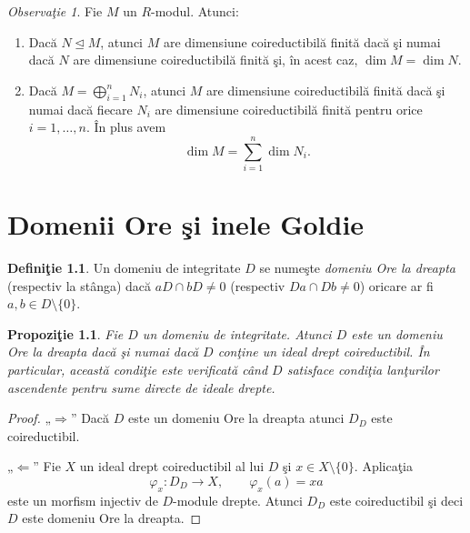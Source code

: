 \documentclass[12pt,a4paper]{book}
\newcommand{\ess}{\trianglelefteq}  %
\theoremstyle{plain}
\newtheorem{proposition}[theorem]{Propoziţie}
\theoremstyle{definition}
\newtheorem{definition}[theorem]{Definiţie}
\theoremstyle{remark}
\newtheorem{remark}[theorem]{Observaţie}
\begin{document}
\begin{remark}
    Fie \(M\) un \(R\)-modul. Atunci:
\begin{enumerate}
  \item Dacă \(N \ess M\), atunci \(M\) are dimensiune coireductibilă
        finită dacă şi numai dacă \(N\) are dimensiune coireductibilă
        finită şi, în acest caz, \(\dim M = \dim N\).
  \item Dacă \(M = \bigoplus_{i=1}^n N_i\), atunci \(M\) are dimensiune
        coireductibilă finită dacă şi numai dacă fiecare \(N_i\) are
        dimensiune coireductibilă finită pentru orice \(i = 1,\dots,n\).
        În plus avem
        \[
          \dim M = \sum_{i=1}^n \dim N_i .
        \]
\end{enumerate}
\end{remark}




\chapter{Domenii Ore şi inele Goldie}

\begin{definition}
Un domeniu de integritate \(D\) se numeşte \emph{domeniu Ore la dreapta}
(respectiv la stânga) dacă \(aD \cap bD \neq 0\)
(respectiv \(Da \cap Db \neq 0\)) oricare ar fi \(a,b \in D \setminus \{0\}\).
\end{definition}

\begin{proposition}
Fie \(D\) un domeniu de integritate.
Atunci \(D\) este un domeniu Ore la dreapta dacă şi numai dacă
\(D\) conţine un ideal drept coireductibil.
În particular, această condiţie este verificată când \(D\) satisface
condiţia lanţurilor ascendente pentru sume directe de ideale drepte.
\end{proposition}

\begin{proof}
„\(\Rightarrow\)” Dacă \(D\) este un domeniu Ore la dreapta atunci
\(D_D\) este coireductibil.

„\(\Leftarrow\)” Fie \(X\) un ideal drept coireductibil al lui \(D\) şi
\(x \in X \setminus \{0\}\).
Aplicaţia
\[
\varphi_x : D_D \longrightarrow X, \qquad \varphi_x(a) = xa
\]
este un morfism injectiv de \(D\)-module drepte.
Atunci \(D_D\) este coireductibil şi deci \(D\) este domeniu Ore la dreapta.
\end{proof}
\end{document}
